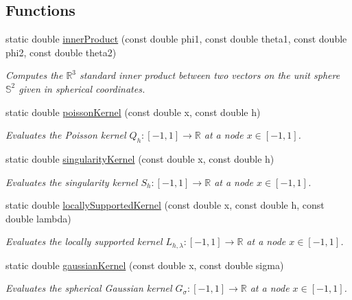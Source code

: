 \subsection*{Functions}
\begin{CompactItemize}
\item 
static double \hyperlink{group__applications__fastsumS2__test_g764f956ac40df99e776155bfa8da2e93}{innerProduct} (const double phi1, const double theta1, const double phi2, const double theta2)
\begin{CompactList}\small\item\em Computes the $\mathbb{R}^3$ standard inner product between two vectors on the unit sphere $\mathbb{S}^2$ given in spherical coordinates. \item\end{CompactList}\item 
static double \hyperlink{group__applications__fastsumS2__test_g6db9bf5c4ee6ca573d6d08a8202a5314}{poissonKernel} (const double x, const double h)
\begin{CompactList}\small\item\em Evaluates the Poisson kernel $Q_h: [-1,1] \rightarrow \mathbb{R}$ at a node $x \in [-1,1]$. \item\end{CompactList}\item 
static double \hyperlink{group__applications__fastsumS2__test_g3f82140c739f6fcf9bc17a03a09f580d}{singularityKernel} (const double x, const double h)
\begin{CompactList}\small\item\em Evaluates the singularity kernel $S_h: [-1,1] \rightarrow \mathbb{R}$ at a node $x \in [-1,1]$. \item\end{CompactList}\item 
static double \hyperlink{group__applications__fastsumS2__test_g226aec741614e0a2d2a9305bc2c28063}{locallySupportedKernel} (const double x, const double h, const double lambda)
\begin{CompactList}\small\item\em Evaluates the locally supported kernel $L_{h,\lambda}: [-1,1] \rightarrow \mathbb{R}$ at a node $x \in [-1,1]$. \item\end{CompactList}\item 
static double \hyperlink{group__applications__fastsumS2__test_g22bfa09881115e4c4f8fef59538d1ce7}{gaussianKernel} (const double x, const double sigma)
\begin{CompactList}\small\item\em Evaluates the spherical Gaussian kernel $G_\sigma: [-1,1] \rightarrow \mathbb{R}$ at a node $x \in [-1,1]$. \item\end{CompactList}\item 

\end{CompactItemize}
